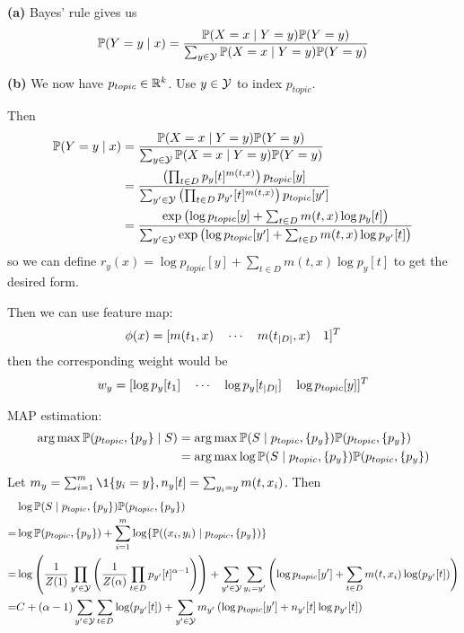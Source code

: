 \documentclass[a4paper, 11pt]{article}
\begin{document}
\begin{problem} 
    \textbf{(a)} Bayes' rule gives us
    \begin{align*}
    \mathbb{P}(Y = y \mid x) &= \frac{\mathbb{P}(X = x \mid Y= y)\mathbb{P}(Y = y)}{\sum_{y \in \mathcal{Y}} \mathbb{P}(X = x \mid Y= y) \mathbb{P}(Y = y)} \\
    \end{align*}

    \textbf{(b)} We now have $p_{topic} \in \mathbb{R}^k$. Use $y \in \mathcal{Y}$ to index $p_{topic}$.

    Then 
    \begin{align*}
    \mathbb{P}(Y = y \mid x) &= \frac{\mathbb{P}(X = x \mid Y= y)\mathbb{P}(Y = y)}{\sum_{y \in \mathcal{Y}} \mathbb{P}(X = x \mid Y= y) \mathbb{P}(Y = y)} \\
    &= \frac{\left(\prod_{t \in D} p_y[t]^{m(t, x)} \right) p_{topic}[y]}{\sum_{y' \in \mathcal{Y}} \left(\prod_{t \in D} p_{y'}[t]^{m(t, x)} \right) p_{topic}[y']} \\
    &= \frac{\exp\left(\log p_{topic}[y] + \sum_{t \in D} m(t, x)\log p_y[t]\right)}{\sum_{y' \in \mathcal{Y}} \exp\left(\log p_{topic}[y'] + \sum_{t \in D} m(t, x)\log p_{y'}[t]\right)}
    \end{align*}
    so we can define $r_y(x) = \log p_{topic}[y] + \sum_{t \in D} m(t, x)\log p_y[t]$ to get the desired form.

    Then we can use feature map: \begin{equation*}
    \phi(x) = [m(t_1, x) \quad \cdots \quad m(t_{\lvert D\rvert}, x) \quad 1]^T
    \end{equation*}
    then the corresponding weight would be \begin{equation*}
    w_y = [\log p_y[t_1] \quad \cdots \quad \log p_y[t_{\lvert D\rvert}] \quad \log p_{topic}[y]]^T
    \end{equation*}

    MAP estimation: 
    \begin{align*}
    \operatorname*{arg\,max} \mathbb{P}(p_{topic}, \{p_y\} \mid S) &= \operatorname*{arg\,max} \mathbb{P}(S \mid p_{topic}, \{p_y\}) \mathbb{P} (p_{topic}, \{p_y\})  \\
        &= \operatorname*{arg\,max} \log \mathbb{P}(S \mid p_{topic}, \{p_y\}) \mathbb{P} (p_{topic}, \{p_y\})
    \end{align*}
    Let $m_{y} = \sum_{i=1}^{m} \1 \{y_i = y\}, n_y[t] = \sum_{y_i = y} m(t, x_i)$. Then
    \begin{align*}
    &\log \mathbb{P}(S \mid p_{topic}, \{p_y\}) \mathbb{P}(p_{topic}, \{p_y\}) \\
    = & \log \mathbb{P}(p_{topic}, \{p_y\}) + \sum_{i=1}^{m} \log \{\mathbb{P}((x_i, y_i) \mid p_{topic}, \{p_y\})\} \\
    = & \log \left(\frac{1}{Z(1)} \prod_{y' \in \mathcal{Y}} \left(\frac{1}{Z(\alpha)} \prod_{t \in D} p_{y'}[t]^{\alpha - 1}\right) \right) + \sum_{y' \in \mathcal{Y}} \sum_{y_i = y'} \left(\log p_{topic}[y'] + \sum_{t \in D} m(t, x_i)\log(p_{y'}[t])\right) \\
    =& C + (\alpha - 1) \sum_{y' \in \mathcal{Y}} \sum_{t \in D} \log(p_{y'}[t]) + \sum_{y' \in \mathcal{Y}} m_{y'} \left( \log p_{topic}[y'] + n_{y'}[t] \log p_{y'}[t]\right)
    \end{align*}
    

\end{problem}
\end{document}
